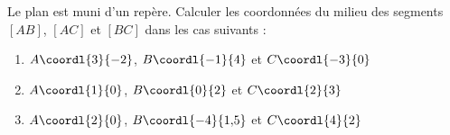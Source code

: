 \begin{exo}
	Le plan est muni d'un repère. Calculer les coordonnées du milieu des segments $[AB]$, $[AC]$ et $[BC]$ dans les cas suivants :
	\begin{enumerate}
		\item $A\coordl{3}{-2}$, $B\coordl{-1}{4}$ et $C\coordl{-3}{0}$
		\item $A\coordl{1}{0}$, $B\coordl{0}{2}$ et $C\coordl{2}{3}$
		\item $A\coordl{2}{0}$, $B\coordl{-4}{1{,}5}$ et $C\coordl{4}{2}$
	\end{enumerate}
\end{exo}
